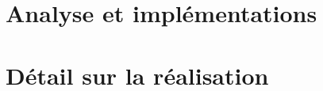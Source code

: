 \documentclass[a4paper,12pt]{report}
\begin{document}
	
	\tableofcontents	
		
	
	
	\part{Analyse et implémentations}
	
	
	\part{Détail sur la réalisation}
	
	
	
	\newpage
	\appendix
	
\end{document}

